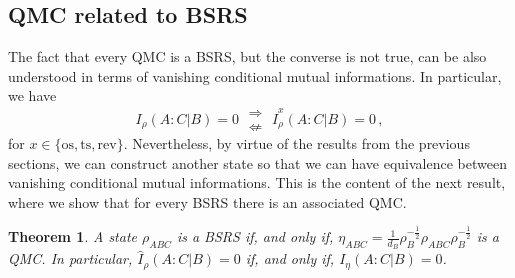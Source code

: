 \documentclass[11pt]{article}
\theoremstyle{newdefinition}
\theoremstyle{newplain}
\newtheorem{theorem}[definition]{Theorem}
\theoremstyle{myplain}
\DeclareMathOperator{\1}{\mathds{1}}
\begin{document}
\subsection{QMC related to BSRS}
The fact that every QMC is a BSRS, but the converse is not true, can be also understood in terms of vanishing conditional mutual informations. In particular, we have 
\begin{equation}
    I_{\rho}(A:C|B) = 0 \; \begin{array}{c}
        \Rightarrow   \\
         \nLeftarrow 
    \end{array} \;  \widehat{I}^x_{\rho}(A:C|B) = 0 \, ,
\end{equation}
for $x \in \{ \text{os}, \text{ts}, \text{rev}\} $. Nevertheless, by virtue of the results from the previous sections, we can construct another state so that we can have equivalence between vanishing conditional mutual informations. This is the content of the next result, where we show that for every BSRS there is an associated  QMC. 
    \begin{theorem}\label{thm:equiv_BSCMIzero_CMIzero}
    A state $\rho_{ABC}$ is a BSRS if, and only if, $\eta_{ABC}=\frac{1}{d_B} \rho_B^{-\frac{1}{2}}\rho_{ABC}\rho_B^{-\frac{1}{2}}$ is a QMC. In particular, $\widehat{I}_{\rho}(A:C\vert B)=0$ if, and only if, $I_{\eta}(A:C\vert B)=0$.
\end{theorem}
\end{document}
